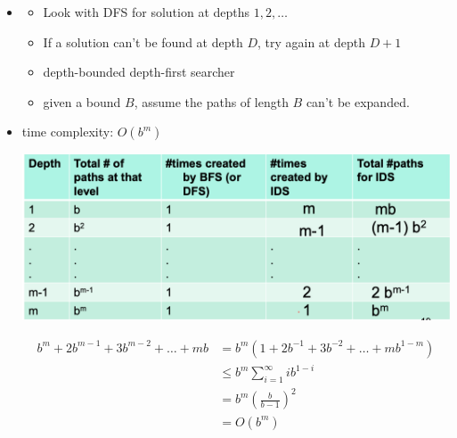 \documentclass{article}
\begin{document}
\begin{itemize}
    \item
        \begin{itemize}
            \item Look with DFS for solution at depths $1, 2, \ldots$
            \item If a solution can't be found at depth $D$, try again at depth $D+1$
            \item depth-bounded depth-first searcher
            \item given a bound $B$, assume the paths of length $B$ can't be expanded.
        \end{itemize}
    \item time complexity: $O(b^m)$

    \includegraphics[scale=0.3]{ids_time_complexity}
    
    \begin{align*}
        b^m  + 2b^{m-1} + 3b^{m-2} + \ldots + mb 
        &= b^m (1 + 2b^{-1} + 3b^{-2} + \ldots + mb^{1-m}) \\
        & \leq b^m \sum\limits_{i=1}^{\infty} ib^{1-i} \\
        &= b^m (\frac{b}{b-1})^2 \\
        &= O(b^m)
    \end{align*}
\end{itemize}
\end{document}
